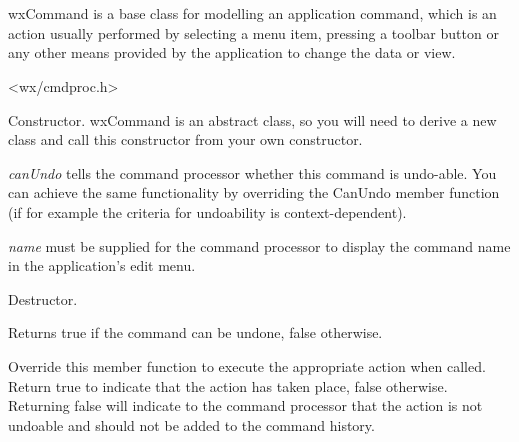\section{}\label{wxcommand}

wxCommand is a base class for modelling an application command,
which is an action usually performed by selecting a menu item, pressing
a toolbar button or any other means provided by the application to
change the data or view.




<wx/cmdproc.h>






Constructor. wxCommand is an abstract class, so you will need to derive
a new class and call this constructor from your own constructor.

{\it canUndo} tells the command processor whether this command is undo-able. You
can achieve the same functionality by overriding the CanUndo member function (if for example
the criteria for undoability is context-dependent).

{\it name} must be supplied for the command processor to display the command name
in the application's edit menu.



Destructor.



Returns true if the command can be undone, false otherwise.



Override this member function to execute the appropriate action when called.
Return true to indicate that the action has taken place, false otherwise.
Returning false will indicate to the command processor that the action is
not undoable and should not be added to the command history.

